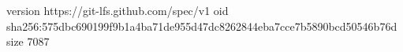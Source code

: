 version https://git-lfs.github.com/spec/v1
oid sha256:575dbc690199f9b1a4ba71de955d47dc8262844eba7cce7b5890bcd50546b76d
size 7087
